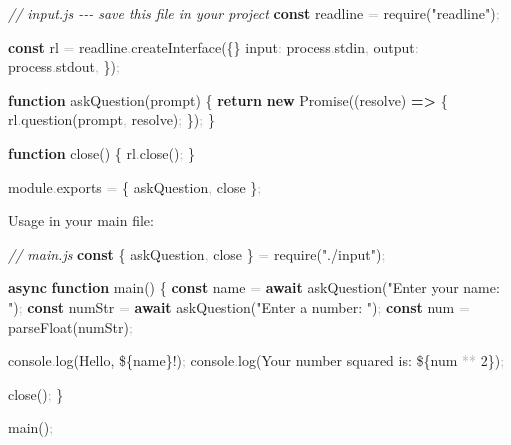 \documentclass[
  justified,
  openright,
]{tufte-book}
\newcommand{\KeywordTok}[1]{\textcolor{CodeKeyword}{\textbf{#1}}}  %
\newcommand{\StringTok}[1]{\textcolor{CodeString}{#1}}              %
\newcommand{\CommentTok}[1]{\textcolor{CodeComment}{\textit{#1}}}  %
\newcommand{\CodeNumTok}[1]{\textcolor{CodeNumber}{#1}}             %
\newcommand{\CodeFuncTok}[1]{\textcolor{CodeKeyword}{#1}}           %
\newcommand{\CodeTypeTok}[1]{\textcolor{CodeType}{#1}}              %
\newcommand{\CodeAccentTok}[1]{\textcolor{CodeAccent}{#1}}          %
\newcommand{\OperatorTok}[1]{\textcolor{DarkGray}{#1}}              %
\newenvironment{Shaded}{%
  \begin{mdframed}[style=TufteCode]%
}{%
  \end{mdframed}%
}
\begin{document}
\begin{Shaded}
\begin{Highlighting}[]
\CommentTok{// input.js {-}{-}{-} save this file in your project}
\KeywordTok{const} readline \OperatorTok{=} \CodeAccentTok{require}(\StringTok{"readline"})\OperatorTok{;}
 
\KeywordTok{const} rl \OperatorTok{=} readline\OperatorTok{.}\CodeFuncTok{createInterface}(\{\}
  \CodeTypeTok{input}\OperatorTok{:} process\OperatorTok{.}\CodeTypeTok{stdin}\OperatorTok{,}
  \CodeTypeTok{output}\OperatorTok{:} process\OperatorTok{.}\CodeTypeTok{stdout}\OperatorTok{,}
\})\OperatorTok{;}
 
\KeywordTok{function} \CodeFuncTok{askQuestion}(prompt) \{
  \KeywordTok{return} \KeywordTok{new} Promise((resolve) \KeywordTok{=\textgreater{}} \{
    rl\OperatorTok{.}\CodeFuncTok{question}(prompt\OperatorTok{,} resolve)\OperatorTok{;}
  \})\OperatorTok{;}
\}
 
\KeywordTok{function} \CodeFuncTok{close}() \{
  rl\OperatorTok{.}\CodeFuncTok{close}()\OperatorTok{;}
\}
 
module\OperatorTok{.}\CodeTypeTok{exports} \OperatorTok{=} \{ askQuestion\OperatorTok{,} close \}\OperatorTok{;}
\end{Highlighting}
\end{Shaded}

Usage in your main file:

\begin{Shaded}
\begin{Highlighting}[]
\CommentTok{// main.js}
\KeywordTok{const} \{ askQuestion\OperatorTok{,} close \} \OperatorTok{=} \CodeAccentTok{require}(\StringTok{"./input"})\OperatorTok{;}
 
\KeywordTok{async} \KeywordTok{function} \CodeFuncTok{main}() \{
  \KeywordTok{const} name \OperatorTok{=} \KeywordTok{await} \CodeFuncTok{askQuestion}(\StringTok{"Enter your name: "})\OperatorTok{;}
  \KeywordTok{const} numStr \OperatorTok{=} \KeywordTok{await} \CodeFuncTok{askQuestion}(\StringTok{"Enter a number: "})\OperatorTok{;}
  \KeywordTok{const} num \OperatorTok{=} \CodeAccentTok{parseFloat}(numStr)\OperatorTok{;}
 
  console\OperatorTok{.}\CodeFuncTok{log}(\StringTok{\textasciigrave{}Hello, }\StringTok{\$\{}name\StringTok{\}}\StringTok{!\textasciigrave{}})\OperatorTok{;}
  console\OperatorTok{.}\CodeFuncTok{log}(\StringTok{\textasciigrave{}Your number squared is: }\StringTok{\$\{}num \OperatorTok{**} \CodeNumTok{2}\StringTok{\}}\StringTok{\textasciigrave{}})\OperatorTok{;}
 
  \CodeFuncTok{close}()\OperatorTok{;}
\}
 
\CodeFuncTok{main}()\OperatorTok{;}
\end{Highlighting}
\end{Shaded}
\end{document}

